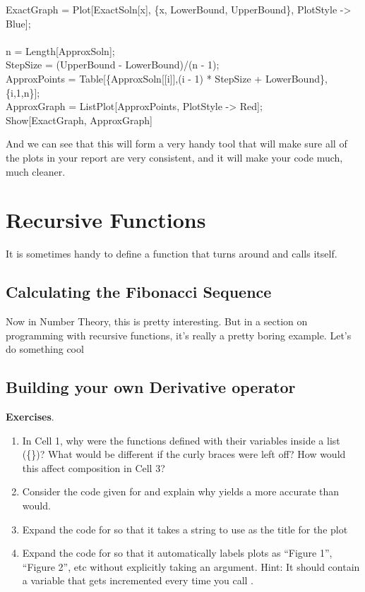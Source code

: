 \begin{code}
	   ExactGraph = Plot[ExactSoln[x], \{x, LowerBound, UpperBound\}, PlotStyle -> Blue];\\
	   \\
	   n = Length[ApproxSoln];\\
	   StepSize = (UpperBound - LowerBound)/(n - 1);\\
	   ApproxPoints = Table[\{ApproxSoln[[i]],(i - 1) * StepSize + LowerBound\},\{i,1,n\}];\\
	   ApproxGraph = ListPlot[ApproxPoints, PlotStyle -> Red];\\
	   Show[ExactGraph, ApproxGraph]
\end{code}

And we can see that this will form a very handy tool that will make sure all of the plots in your report are very consistent, and it will make your code much, much cleaner.

\section{Recursive Functions}

It is sometimes handy to define a function that turns around and calls itself.

\subsection{Calculating the Fibonacci Sequence}

Now in Number Theory, this is pretty interesting. But in a section on programming with recursive functions, it's really a pretty boring example. Let's do something cool

\subsection{Building your own Derivative operator}


\textbf{Exercises}.
\begin{enumerate}
	   \item In Cell 1, why were the functions defined with their variables inside a list (\{\})? What would be different if the curly braces were left off? How would this affect composition in Cell 3?
	   \item Consider the code given for  and explain why  yields a more accurate  than  would.
	   \item Expand the code for  so that it takes a string to use as the title for the plot
	   \item Expand the code for  so that it automatically labels plots as ``Figure 1'', ``Figure 2'', etc without explicitly taking an argument. Hint: It should contain a variable that gets incremented every time you call . 
\end{enumerate}
